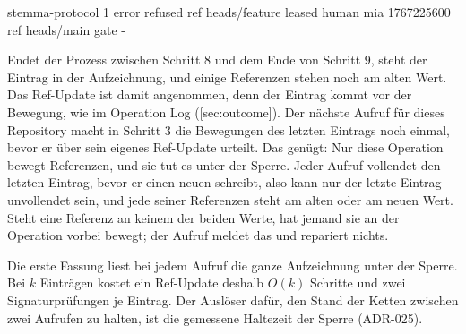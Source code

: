 \starttyping
stemma-protocol 1
error refused
ref heads/feature leased human mia 1767225600
ref heads/main gate -
\stoptyping

Endet der Prozess zwischen Schritt 8 und dem Ende von Schritt 9, steht der Eintrag in der
Aufzeichnung, und einige Referenzen stehen noch am alten Wert.
Das Ref-Update ist damit angenommen, denn der Eintrag kommt vor der Bewegung, wie im Operation
Log ([sec:outcome]).
Der nächste Aufruf für dieses Repository macht in Schritt 3 die Bewegungen des letzten Eintrags
noch einmal, bevor er über sein eigenes Ref-Update urteilt.
Das genügt: Nur diese Operation bewegt Referenzen, und sie tut es unter der Sperre.
Jeder Aufruf vollendet den letzten Eintrag, bevor er einen neuen schreibt, also kann nur der
letzte Eintrag unvollendet sein, und jede seiner Referenzen steht am alten oder am neuen Wert.
Steht eine Referenz an keinem der beiden Werte, hat jemand sie an der Operation vorbei bewegt;
der Aufruf meldet das und repariert nichts.

Die erste Fassung liest bei jedem Aufruf die ganze Aufzeichnung unter der Sperre.
Bei $k$ Einträgen kostet ein Ref-Update deshalb $O(k)$ Schritte und zwei Signaturprüfungen je
Eintrag.
Der Auslöser dafür, den Stand der Ketten zwischen zwei Aufrufen zu halten, ist die gemessene
Haltezeit der Sperre (ADR-025).

